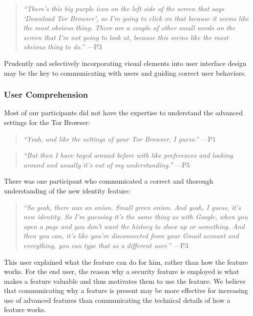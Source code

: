 \documentclass[letterpaper,twocolumn,11pt]{article}
\begin{document}
\begin{quote}{\it
``There's this big purple icon on the left side of the screen that says `Download Tor Browser',
so I'm going to click on that because it seems like the most obvious thing.
There are a couple of other small words on the screen that I'm not going to look at, because this seems like the most obvious thing to do.''} \mbox{---P3}
\end{quote}

Prudently and selectively incorporating visual elements into user interface design may be the key to 
communicating with users and guiding correct user behaviors.

\subsubsection{User Comprehension} 

Most of our participants did not have the expertise to understand 
the advanced settings for the Tor Browser: 

\begin{quote}{\it
``Yeah, and like the settings of your Tor Browser, I guess.''} \mbox{---P1}
\end{quote}

\begin{quote}{\it
``But then I have toyed around before with like preferences and looking around and 
usually it's out of my understanding.''} \mbox{---P5}
\end{quote}

There was one participant who communicated a correct and thorough understanding of the 
new identity feature: 

\begin{quote}{\it
``So yeah, there was an onion. Small green onion. And yeah, I guess, it's new identity.
So I'm guessing it's the same thing as with Google, when you open a page and you don't 
want the history to show up or something. And then you can, it's like you're disconnected 
from your Gmail account and everything, you can type that as a different user.''} \mbox{---P3} 
\end{quote}

This user explained what the feature can do for him, rather than how the 
feature works. For the end user, the reason why a security feature is employed is what 
makes a feature valuable and thus motivates them to use the feature. We believe that communicating why a 
feature is present may be more effective for increasing use of advanced features 
than communicating the technical details of how a feature works. 
\end{document}
